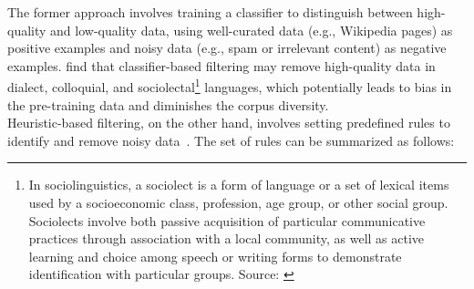 The former approach involves training a classifier to distinguish between high-quality and low-quality data, using well-curated data (e.g., Wikipedia pages) as positive examples and noisy data (e.g., spam or irrelevant content) as negative examples.
\textcite{rae2021scaling, du2022glam} find that classifier-based filtering may remove high-quality data in dialect, colloquial, and sociolectal\footnote{In sociolinguistics, a sociolect is a form of language or a set of lexical items used by a socioeconomic class, profession, age group, or other social group. Sociolects involve both passive acquisition of particular communicative practices through association with a local community, as well as active learning and choice among speech or writing forms to demonstrate identification with particular groups. Source: \textcite{wikipedia}} languages, which potentially leads to bias in the pre-training data and diminishes the corpus diversity.\\
Heuristic-based filtering, on the other hand, involves setting predefined rules to identify and remove noisy data~\cite{workshop2023bloom, rae2021scaling}.
The set of rules can be summarized as follows:
